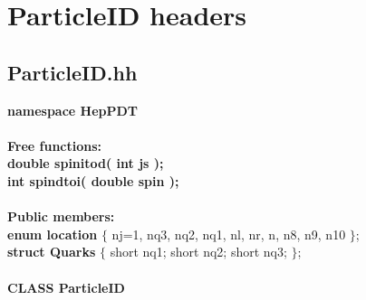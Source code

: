 \documentclass[twoside,12pt]{article}
\begin{document}
\section {ParticleID headers}
\label{PIDclass}

\subsection {ParticleID.hh}

\begin{tabbing}

{\bf namespace HepPDT} \\  \\

{\bf Free functions:} \\
\hspace{0.5in}  {\bf double spinitod( int js ); } \\
\hspace{0.5in}  {\bf int spindtoi( double spin ); } \\  \\

{\bf Public members:} \\
\hspace{0.5in}  {\bf enum location } 
       $\{$ nj=1, nq3, nq2, nq1, nl, nr, n, n8, n9, n10 $\}$; \\
\hspace{0.5in}  {\bf  struct Quarks } $\{$
    short nq1;
    short nq2;
    short nq3; $\}$; \\  \\

{\bf CLASS ParticleID } \\  \\


\end{tabbing}
\end{document}
